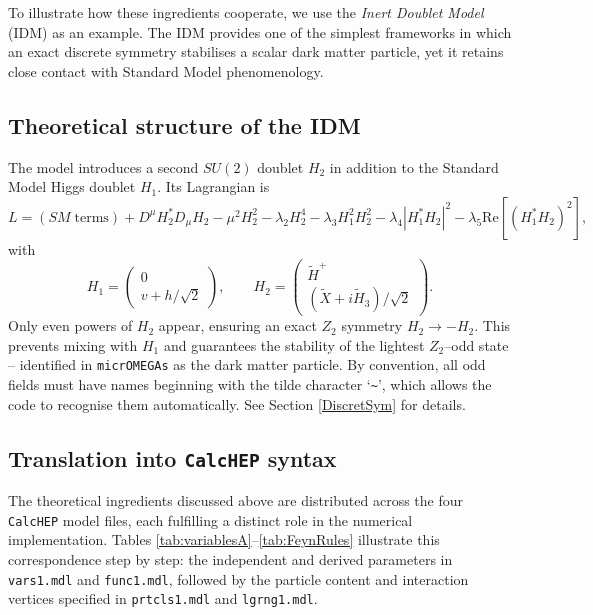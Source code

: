 \documentclass[12pt,a4paper]{article}
\begin{document}
To illustrate how these ingredients cooperate, we use the \emph{Inert Doublet Model} (IDM) as an example.  
The IDM provides one of the simplest frameworks in which an exact discrete symmetry stabilises a scalar dark matter particle, yet it retains close contact with Standard Model phenomenology.

\subsection{Theoretical structure of the IDM}

The model introduces a second $SU(2)$ doublet $H_2$ in addition to the Standard Model Higgs doublet $H_1$.  
Its Lagrangian is
\begin{equation}
\label{L_IDM}
  L = (SM\;\text{terms}) + D^{\mu}H_2^*D_{\mu}H_2 
 - \mu^2 H_2^2 - \lambda_2 H_2^4 - \lambda_3 H_1^2H_2^2
- \lambda_4 |H_1^*H_2|^2 - \lambda_5 \text{Re}\!\left[(H_1^*H_2)^2\right],
\end{equation}
with
\begin{equation}
H_1 =
\begin{pmatrix}
0 \\ v + h/\sqrt{2}
\end{pmatrix},\qquad
H_2 =
\begin{pmatrix}
\tilde H^+ \\ (\tilde X + i\tilde H_3)/\sqrt{2}
\end{pmatrix}.
\end{equation}
Only even powers of $H_2$ appear, ensuring an exact $Z_2$ symmetry $H_2 \to -H_2$.
This prevents mixing with $H_1$ and guarantees the stability of the lightest $Z_2$--odd state -- identified in \texttt{micrOMEGAs} as the dark matter particle.
By convention, all odd fields must have names beginning with the tilde character `\verb|~|', which allows the code to recognise them automatically.
See  Section \ref{DiscretSym} for details. 

\subsection{Translation into \texttt{CalcHEP} syntax}

The theoretical ingredients discussed above are distributed across the four \texttt{CalcHEP} model files, each fulfilling a distinct role in the numerical implementation.  
Tables \ref{tab:variablesA}--\ref{tab:FeynRules} illustrate this correspondence step by step: the independent and derived parameters in \texttt{vars1.mdl} and \texttt{func1.mdl}, followed by the particle content and interaction vertices specified in \texttt{prtcls1.mdl} and \texttt{lgrng1.mdl}.
\end{document}
